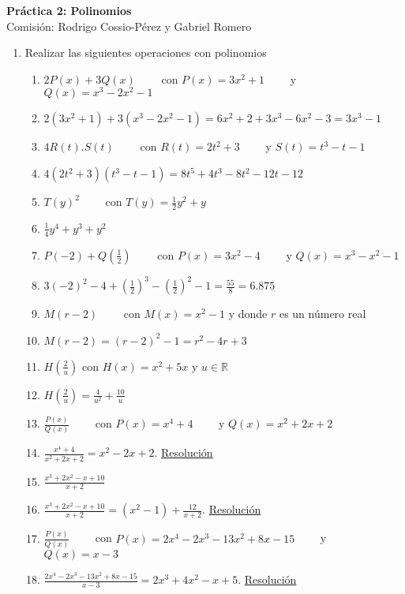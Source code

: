 \documentclass[a4paper]{article}
\newcommand{\answer}{\item[**]}
\newcommand{\exercise}{\item}
\newcommand{\df}[2]{\displaystyle\frac{#1}{#2}}
\begin{document}
\noindent \hrulefill 
\vspace{-7pt}
\begin{center} 
	\textbf{ Práctica 2: Polinomios } \\
	Comisión: Rodrigo Cossio-Pérez y Gabriel Romero
\end{center}
\vspace{-10pt}
\hrulefill


\begin{enumerate}

	\exercise Realizar las siguientes operaciones con polinomios
	\begin{enumerate} [label=(\alph*)]
		
		\item $2P(x)+3Q(x)$ ~~~~con $P(x)=3x^2+1$ ~~~~y $Q(x)=x^3-2x^2-1$
		\answer $2(3x^2+1)+3(x^3-2x^2-1)=6x^2+2+3x^3-6x^2-3=3x^3-1$

		\item $4R(t).S(t)$ ~~~~con $R(t)=2t^2+3$ ~~~~y $S(t)=t^3-t-1$
		\answer $4(2t^2+3)(t^3-t-1)=8t^5+4t^3-8t^2-12t-12$ 

		\item $T(y)^2$ ~~~~con $T(y)=\df{1}{2}y^2+y$
		\answer $\df{1}{4}y^4+y^3+y^2$

		\item $P(-2)+Q\left(\df{1}{2}\right)$ ~~~~con $P(x)=3x^2-4$ ~~~~y $Q(x)=x^3-x^2-1$
		\answer $3(-2)^2-4+\left(\df{1}{2}\right)^3-\left(\df{1}{2}\right)^2-1=\df{55}{8} = 6.875$

		\item $M(r-2)$ ~~~~con $M(x)=x^2-1$ y donde $r$ es un número real
		\answer $M(r-2)=(r-2)^2-1=r^2-4r+3$

		\item $H\left(\df{2}{u}\right)$ con $H(x)=x^2+5x$ y $u \in \mathbb{R}$
		\answer $H\left(\df{2}{u}\right)=\df{4}{u^2}+\df{10}{u}$

		\item $\df{P(x)}{Q(x)}$ ~~~~con $P(x)=x^4+4$ ~~~~y $Q(x)=x^2+2x+2$
		\answer $\df{x^4+4}{x^2+2x+2}=x^2-2x+2$. \href{https://youtu.be/DWDi7BKAKbc}{Resolución}

		\item $\df{x^3+2x^2-x+10}{x+2}$
		\answer $\df{x^3+2x^2-x+10}{x+2}=(x^2-1)+\df{12}{x+2}$. \href{https://youtu.be/bfCWsvZfFq0}{Resolución}

		\item $\df{P(x)}{Q(x)}$ ~~~~con $P(x)=2x^4-2x^3-13x^2+8x-15$ ~~~~y $Q(x)=x-3$
		\answer $\df{2x^4-2x^3-13x^2+8x-15}{x-3}=2x^3+4x^2-x+5$. \href{https://youtu.be/W3HcTD4IC94}{Resolución}


\end{enumerate}
\end{enumerate}
\end{document}
